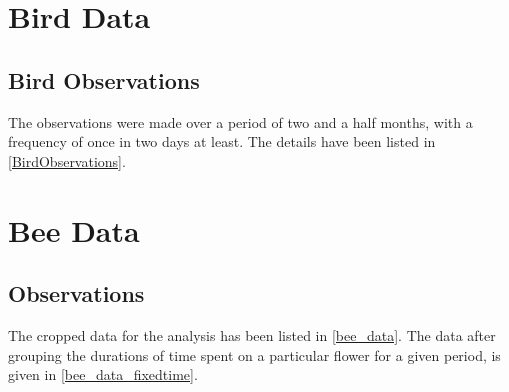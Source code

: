 \chapter{Bird Data}

\section{Bird Observations}
	The observations were made over a period of two and a half months, with a frequency of once in two days at least. The details have been listed in \autoref{BirdObservations}.
	

\chapter{Bee Data}
	\section{Observations}
	The cropped data for the analysis has been listed in \autoref{bee_data}. The data after grouping the durations of time spent on a particular flower for a given period, is given in \autoref{bee_data_fixedtime}.
	
	
